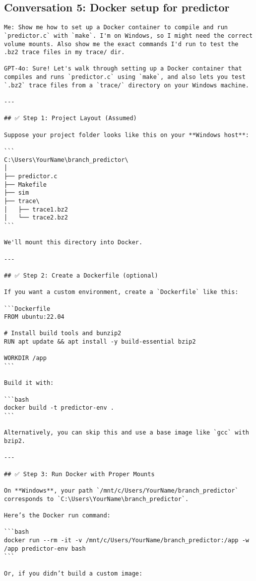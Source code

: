 \documentclass[11pt]{article}
\begin{document}
\subsection{Conversation 5: Docker setup for predictor}
\begin{verbatim}
Me: Show me how to set up a Docker container to compile and run `predictor.c` with `make`. I'm on Windows, so I might need the correct volume mounts. Also show me the exact commands I'd run to test the .bz2 trace files in my trace/ dir.

GPT-4o: Sure! Let's walk through setting up a Docker container that compiles and runs `predictor.c` using `make`, and also lets you test `.bz2` trace files from a `trace/` directory on your Windows machine.

---

## ✅ Step 1: Project Layout (Assumed)

Suppose your project folder looks like this on your **Windows host**:

```
C:\Users\YourName\branch_predictor\
│
├── predictor.c
├── Makefile
├── sim
├── trace\
│   ├── trace1.bz2
│   └── trace2.bz2
```

We'll mount this directory into Docker.

---

## ✅ Step 2: Create a Dockerfile (optional)

If you want a custom environment, create a `Dockerfile` like this:

```Dockerfile
FROM ubuntu:22.04

# Install build tools and bunzip2
RUN apt update && apt install -y build-essential bzip2

WORKDIR /app
```

Build it with:

```bash
docker build -t predictor-env .
```

Alternatively, you can skip this and use a base image like `gcc` with bzip2.

---

## ✅ Step 3: Run Docker with Proper Mounts

On **Windows**, your path `/mnt/c/Users/YourName/branch_predictor` corresponds to `C:\Users\YourName\branch_predictor`.

Here’s the Docker run command:

```bash
docker run --rm -it -v /mnt/c/Users/YourName/branch_predictor:/app -w /app predictor-env bash
```

Or, if you didn’t build a custom image:


\end{verbatim}
\end{document}
